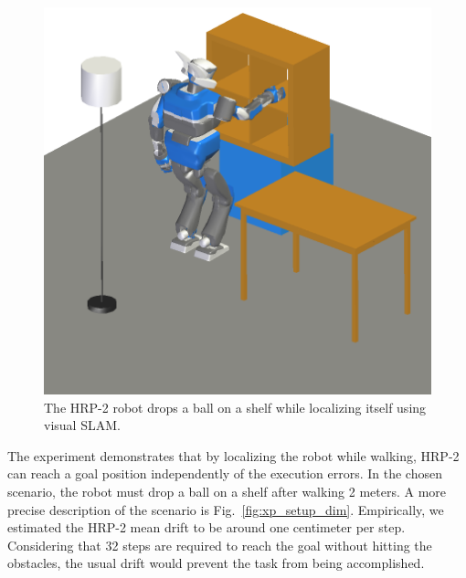 \begin{figure}[ht!] %
  \begin{center}
    \includegraphics[width=\linewidth]{images/trajectory-8.png}
  \end{center}
  \caption{The HRP-2 robot drops a ball on a shelf while localizing
    itself using visual SLAM. \label{fig:xp_setup_screenshot}}
\end{figure}


The experiment demonstrates that by localizing the robot while
walking, HRP-2 can reach a goal position independently of the
execution errors. In the chosen scenario, the robot must drop a ball
on a shelf after walking 2 meters. A more precise description of the
scenario is Fig.~\ref{fig:xp_setup_dim}. Empirically, we estimated the
HRP-2 mean drift to be around one centimeter per step. Considering
that 32 steps are required to reach the goal without hitting the
obstacles, the usual drift would prevent the task from being
accomplished.

